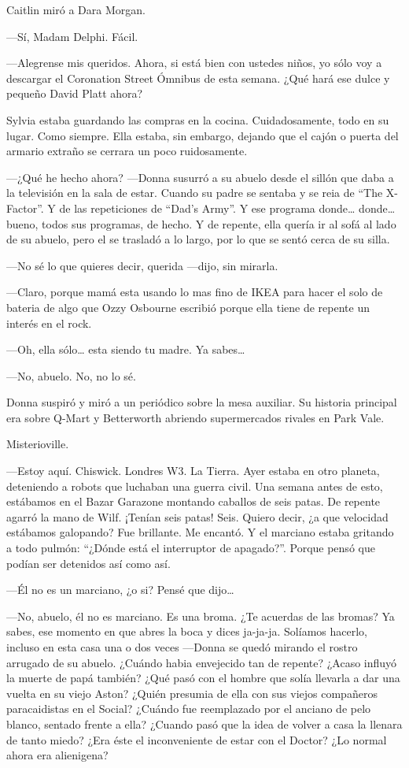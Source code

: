 Caitlin miró a Dara Morgan.

---Sí, Madam Delphi. Fácil.

---Alegrense mis queridos. Ahora, si está bien con ustedes niños, yo
sólo voy a descargar el Coronation Street Ómnibus de esta semana. ¿Qué
hará ese dulce y pequeño David Platt ahora?

Sylvia estaba guardando las compras en la cocina. Cuidadosamente, todo
en su lugar. Como siempre. Ella estaba, sin embargo, dejando que el
cajón o puerta del armario extraño se cerrara un poco ruidosamente.

---¿Qué he hecho ahora? ---Donna susurró a su abuelo desde el sillón que
daba a la televisión en la sala de estar. Cuando su padre se sentaba y
se reia de ``The X-Factor''. Y de las repeticiones de ``Dad's Army''. Y
ese programa donde\ldots{} donde\ldots{} bueno, todos sus programas, de
hecho. Y de repente, ella quería ir al sofá al lado de su abuelo, pero
el se trasladó a lo largo, por lo que se sentó cerca de su silla.

---No sé lo que quieres decir, querida ---dijo, sin mirarla.

---Claro, porque mamá esta usando lo mas fino de IKEA para hacer el solo
de bateria de algo que Ozzy Osbourne escribió porque ella tiene de
repente un interés en el rock.

---Oh, ella sólo\ldots{} esta siendo tu madre. Ya sabes\ldots{}

---No, abuelo. No, no lo sé.

Donna suspiró y miró a un periódico sobre la mesa auxiliar. Su historia
principal era sobre Q-Mart y Betterworth abriendo supermercados rivales
en Park Vale.

Misterioville.

---Estoy aquí. Chiswick. Londres W3. La Tierra. Ayer estaba en otro
planeta, deteniendo a robots que luchaban una guerra civil. Una semana
antes de esto, estábamos en el Bazar Garazone montando caballos de seis
patas. De repente agarró la mano de Wilf. ¡Tenían seis patas! Seis.
Quiero decir, ¿a que velocidad estábamos galopando? Fue brillante. Me
encantó. Y el marciano estaba gritando a todo pulmón: ``¿Dónde está el
interruptor de apagado?''. Porque pensó que podían ser detenidos así
como así.

---Él no es un marciano, ¿o si? Pensé que dijo\ldots{}

---No, abuelo, él no es marciano. Es una broma. ¿Te acuerdas de las
bromas? Ya sabes, ese momento en que abres la boca y dices ja-ja-ja.
Solíamos hacerlo, incluso en esta casa una o dos veces ---Donna se quedó
mirando el rostro arrugado de su abuelo. ¿Cuándo habia envejecido tan de
repente? ¿Acaso influyó la muerte de papá también? ¿Qué pasó con el
hombre que solía llevarla a dar una vuelta en su viejo Aston? ¿Quién
presumia de ella con sus viejos compañeros paracaidistas en el Social?
¿Cuándo fue reemplazado por el anciano de pelo blanco, sentado frente a
ella? ¿Cuando pasó que la idea de volver a casa la llenara de tanto
miedo? ¿Era éste el inconveniente de estar con el Doctor? ¿Lo normal
ahora era alienigena?

